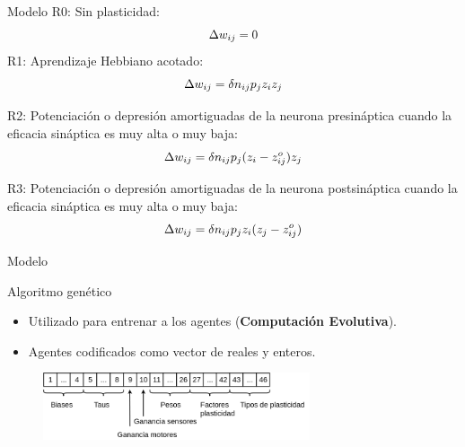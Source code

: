 \documentclass[aspectratio=169]{beamer}
\begin{document}
\begin{frame}{Modelo}
R0: Sin plasticidad:
\begin{equation*}
 \centering
 \Delta w_{ij}= 0
\end{equation*}
R1: Aprendizaje Hebbiano acotado:
\begin{equation*}
 \centering
 \Delta w_{ij}= \delta n_{ij} p_{j} z_{i} z_{j}
\end{equation*}

R2: Potenciación o depresión amortiguadas de la neurona presináptica cuando la eficacia sináptica es muy alta o muy baja:
\begin{equation*}
 \centering
 \Delta w_{ij}= \delta n_{ij} p_{j} (z_{i} - z_{ij}^{o}) z_{j}
\end{equation*}

R3: Potenciación o depresión amortiguadas de la neurona postsináptica cuando la eficacia sináptica es muy alta o muy baja:
\begin{equation*}
 \centering
 \Delta w_{ij}= \delta n_{ij} p_{j} z_{i} (z_{j} - z_{ij}^{o})
\end{equation*}


\end{frame}



\begin{frame}{Modelo}
\begin{block}{Algoritmo genético}
  \begin{itemize}
    \item Utilizado para entrenar a los agentes (\textbf{Computación Evolutiva}).
    \item Agentes codificados como vector de reales y enteros.
  \end{itemize}
  \begin{figure}
    \centering
  \includegraphics[width=0.7\textwidth,height=.3\textheight]{Imagenes/vector0}
\end{figure}
\end{block}
\end{frame}
\end{document}
